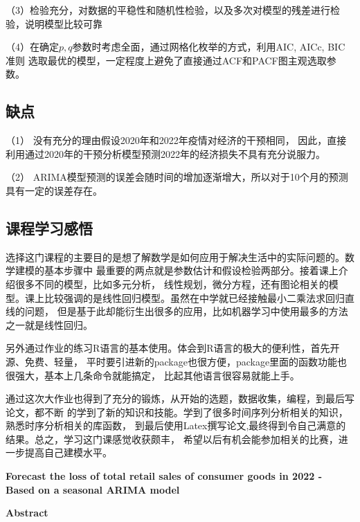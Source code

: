 \documentclass[12pt,a4paper]{nmmcm}
\begin{document}
  （3）检验充分，对数据的平稳性和随机性检验，以及多次对模型的残差进行检验，说明模型比较可靠

  （4）在确定\(p,q\)参数时考虑全面，通过网格化枚举的方式，利用AIC, AICc, BIC准则 
  选取最优的模型，一定程度上避免了直接通过ACF和PACF图主观选取参数。

  \subsection{缺点}
  （1） 没有充分的理由假设2020年和2022年疫情对经济的干预相同，
  因此，直接利用通过2020年的干预分析模型预测2022年的经济损失不具有充分说服力。

  （2） ARIMA模型预测的误差会随时间的增加逐渐增大，所以对于10个月的预测
  具有一定的误差存在。
\subsection*{课程学习感悟}
  选择这门课程的主要目的是想了解数学是如何应用于解决生活中的实际问题的。数学建模的基本步骤中
  最重要的两点就是参数估计和假设检验两部分。接着课上介绍很多不同的模型，比如多元分析，
  线性规划，微分方程，还有图论相关的模型。课上比较强调的是线性回归模型。虽然在中学就已经接触最小二乘法求回归直线的问题，
  但是基于此却能衍生出很多的应用，比如机器学习中使用最多的方法之一就是线性回归。
  
  另外通过作业的练习R语言的基本使用。体会到R语言的极大的便利性，首先开源、免费、轻量，
  平时要引进新的package也很方便，package里面的函数功能也很强大，基本上几条命令就能搞定，
  比起其他语言很容易就能上手。

  通过这次大作业也得到了充分的锻炼，从开始的选题，数据收集，编程，到最后写论文，都不断
  的学到了新的知识和技能。学到了很多时间序列分析相关的知识，熟悉时序分析相关的库函数，
  到最后使用Latex撰写论文,最终得到令自己满意的结果。总之，学习这门课感觉收获颇丰，
  希望以后有机会能参加相关的比赛，进一步提高自己建模水平。



\newpage




\newpage
  \begin{center}
    \large{\textbf{Forecast the loss of total retail sales of consumer goods in 2022
     - Based on a seasonal ARIMA model}}


    \textbf{Abstract}
  \end{center}
  

\newpage
\end{document}
